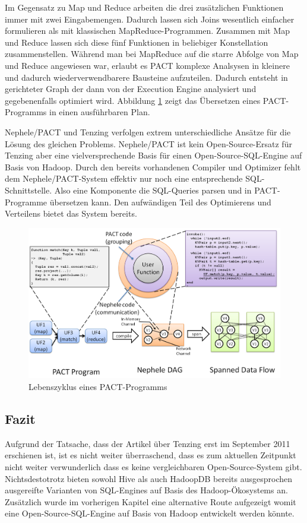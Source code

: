 \documentclass[a4paper]{article}
\begin{document}
Im Gegensatz zu Map und Reduce arbeiten die drei zusätzlichen Funktionen immer mit zwei Eingabemengen. Dadurch lassen sich Joins wesentlich einfacher formulieren als mit klassischen MapReduce-Programmen. Zusammen mit Map und Reduce lassen sich diese fünf Funktionen in beliebiger Konstellation zusammenstellen. Während man bei MapReduce auf die starre Abfolge von Map und Reduce angewiesen war, erlaubt es PACT komplexe Analsysen in kleinere und dadurch wiederverwendbarere Bausteine aufzuteilen. Dadurch entsteht in gerichteter Graph der dann von der Execution Engine analysiert und gegebenenfalls optimiert wird. Abbildung \ref{fig:pact} zeigt das Übersetzen eines PACT-Programms in einen ausführbaren Plan.

Nephele/PACT und Tenzing verfolgen extrem unterschiedliche Ansätze für die Lösung des gleichen Problems. Nephele/PACT ist kein Open-Source-Ersatz für Tenzing aber eine vielversprechende Basis für einen Open-Source-SQL-Engine auf Basis von Hadoop. Durch den bereits vorhandenen Compiler und Optimizer fehlt dem Nephele/PACT-System effektiv nur noch eine entsprechende SQL-Schnittstelle. Also eine Komponente die SQL-Queries parsen und in PACT-Programme übersetzen kann. Den aufwändigen Teil des Optimierens und Verteilens bietet das System bereits. 

\begin{figure}[H]
\centering
\includegraphics[width=\textwidth]{compilation.png}
\caption{Lebenszyklus eines PACT-Programms}
\label{fig:pact}
\end{figure}

\subsection{Fazit}
Aufgrund der Tatsache, dass der Artikel über Tenzing erst im September 2011 erschienen ist, ist es nicht weiter überraschend, dass es zum aktuellen Zeitpunkt nicht weiter verwunderlich dass es keine vergleichbaren Open-Source-System gibt. Nichtsdestotrotz bieten sowohl Hive als auch HadoopDB bereits ausgesprochen ausgereifte Varianten von SQL-Engines auf Basis des Hadoop-Ökosystems an. Zusätzlich wurde im vorherigen Kapitel eine alternative Route aufgezeigt womit eine Open-Source-SQL-Engine auf Basis von Hadoop entwickelt werden könnte.
\end{document}
